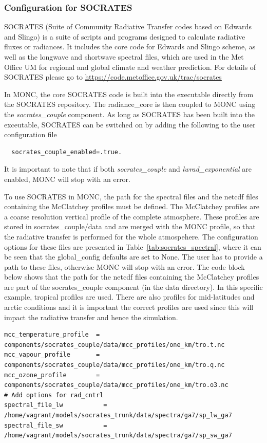 \documentclass[a4paper,11pt]{article}
\begin{document}
\subsubsection{Configuration for SOCRATES}

SOCRATES (Suite of Community Radiative Transfer codes based on Edwards and Slingo)
is a suite of scripts and programs designed to calculate radiative fluxes or radiances.
It includes the core code for Edwards and Slingo scheme, as well as the longwave and
shortwave spectral files, which are used in the Met Office UM for regional and
global climate and weather prediction. For details of SOCRATES please go to
\url{https://code.metoffice.gov.uk/trac/socrates}

In MONC, the core SOCRATES code is built into the executable directly from the
SOCRATES repository. The radiance\_core is then coupled to MONC using the
\emph{socrates\_couple} component. As long as
SOCRATES has been built into the exceutable, SOCRATES can be switched on by
adding the following to the user configuration file
\begin{lstlisting}
  socrates_couple_enabled=.true.
\end{lstlisting}
It is important to note that if both \emph{socrates\_couple} and
\emph{lwrad\_exponential} are enabled, MONC will stop with an error.

To use SOCRATES in MONC, the path for the spectral files and the netcdf files
containing the McClatchey profiles must be defined.
The McClatchey profiles are a coarse resolution vertical profile of the complete
atmosphere. These profiles are stored in socrates\_couple/data and are merged
with the MONC profile, so that the radiative transfer is performed for the
whole atmospehere. The configuration options for these files are presented
in Table~\ref{tab:socrates_spectral}, where it can be seen that the global\_config
defaults are set to None. The user has to provide a path to these files, otherwise
MONC will stop with an error. The code block below shows that the path for the
netcdf files containing the McClatchey profiles are part of the socrates\_couple
component (in the data directory). In this specific example, tropical profiles
are used. There are also profiles for mid-latitudes and arctic conditions and
it is important the correct profiles are used since this will impact the
radiative transfer and hence the simulation.

\begin{lstlisting}[caption={Example configuration for specifying McClatchey profiles .
    and spectral files in socrates\_couple. Taken from testcases/stratus/fire\_sc\_diurnal.mcf}]
mcc_temperature_profile  = components/socrates_couple/data/mcc_profiles/one_km/tro.t.nc
mcc_vapour_profile       = components/socrates_couple/data/mcc_profiles/one_km/tro.q.nc
mcc_ozone_profile        = components/socrates_couple/data/mcc_profiles/one_km/tro.o3.nc
# Add options for rad_cntrl
spectral_file_lw           = /home/vagrant/models/socrates_trunk/data/spectra/ga7/sp_lw_ga7
spectral_file_sw           = /home/vagrant/models/socrates_trunk/data/spectra/ga7/sp_sw_ga7
\end{lstlisting}
\end{document}
